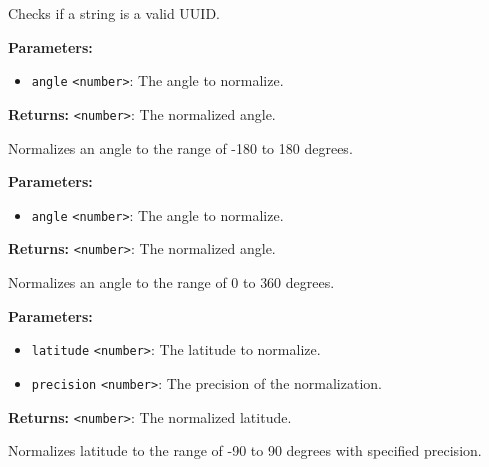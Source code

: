 \documentclass[12pt,a4paper]{article}
\begin{document}
\noindent Checks if a string is a valid UUID.

\vspace{5mm}
\noindent {}


\noindent \textbf{Parameters:}
\begin{itemize}
  \item \texttt{angle} \texttt{<number>}: The angle to normalize.
\end{itemize}

\noindent \textbf{Returns:} \texttt{<number>}: The normalized angle.

\noindent Normalizes an angle to the range of -180 to 180 degrees.

\vspace{5mm}
\noindent {}


\noindent \textbf{Parameters:}
\begin{itemize}
  \item \texttt{angle} \texttt{<number>}: The angle to normalize.
\end{itemize}

\noindent \textbf{Returns:} \texttt{<number>}: The normalized angle.

\noindent Normalizes an angle to the range of 0 to 360 degrees.

\vspace{5mm}
\noindent {}


\noindent \textbf{Parameters:}
\begin{itemize}
  \item \texttt{latitude} \texttt{<number>}: The latitude to normalize.
  \item \texttt{precision} \texttt{<number>}: The precision of the normalization.
\end{itemize}

\noindent \textbf{Returns:} \texttt{<number>}: The normalized latitude.

\noindent Normalizes latitude to the range of -90 to 90 degrees with specified precision.

\vspace{5mm}
\noindent {}
\end{document}
